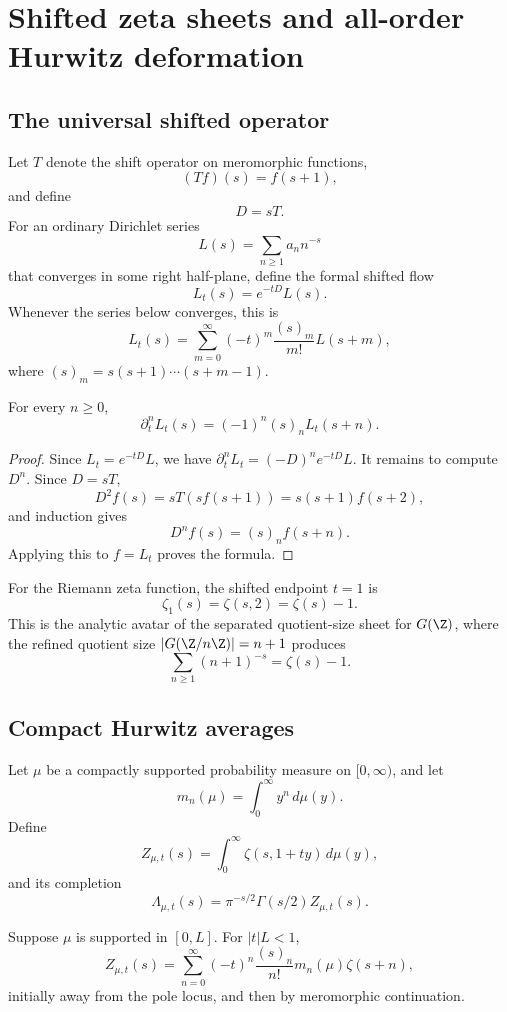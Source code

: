 \section{Shifted zeta sheets and all-order Hurwitz deformation}

\subsection{The universal shifted operator}

Let \(T\) denote the shift operator on meromorphic functions,
\[
   (Tf)(s)=f(s+1),
\]
and define
\[
   D=sT.
\]
For an ordinary Dirichlet series
\[
   L(s)=\sum_{n\ge1}a_n n^{-s}
\]
that converges in some right half-plane, define the formal shifted flow
\[
   L_t(s)=e^{-tD}L(s).
\]
Whenever the series below converges, this is
\[
   L_t(s)=\sum_{m=0}^\infty (-t)^m\frac{(s)_m}{m!}L(s+m),
\]
where \((s)_m=s(s+1)\cdots(s+m-1)\).

\begin{proposition}\label{prop:universal-jet}
For every \(n\ge0\),
\[
   \partial_t^nL_t(s)=(-1)^n(s)_nL_t(s+n).
\]
\end{proposition}

\begin{proof}
Since \(L_t=e^{-tD}L\), we have \(\partial_t^nL_t=(-D)^ne^{-tD}L\).  It remains to compute \(D^n\).  Since \(D=sT\),
\[
   D^2 f(s)=sT(sf(s+1))=s(s+1)f(s+2),
\]
and induction gives
\[
   D^n f(s)=(s)_n f(s+n).
\]
Applying this to \(f=L_t\) proves the formula.
\end{proof}

For the Riemann zeta function, the shifted endpoint \(t=1\) is
\[
   \zeta_1(s)=\zeta(s,2)=\zeta(s)-1.
\]
This is the analytic avatar of the separated quotient-size sheet for \(G(\Z)\), where the refined quotient size \(|G(\Z/n\Z)|=n+1\) produces
\[
   \sum_{n\ge1}(n+1)^{-s}=\zeta(s)-1.
\]

\subsection{Compact Hurwitz averages}

Let \(\mu\) be a compactly supported probability measure on \([0,\infty)\), and let
\[
   m_n(\mu)=\int_0^\infty y^n\,d\mu(y).
\]
Define
\[
   Z_{\mu,t}(s)=\int_0^\infty \zeta(s,1+ty)\,d\mu(y),
\]
and its completion
\[
   \Lambda_{\mu,t}(s)=\pi^{-s/2}\Gamma(s/2)Z_{\mu,t}(s).
\]

\begin{proposition}\label{prop:compact-expansion}
Suppose \(\mu\) is supported in \([0,L]\).  For \(|t|L<1\),
\[
   Z_{\mu,t}(s)=\sum_{n=0}^\infty
   (-t)^n\frac{(s)_n}{n!}m_n(\mu)\zeta(s+n),
\]
initially away from the pole locus, and then by meromorphic continuation.
\end{proposition}

